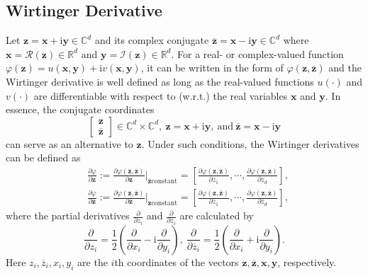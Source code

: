\documentclass{article}
\numberwithin{equation}{section}
\begin{document}
\subsection{Wirtinger Derivative}
Let $\mathbf{z}=\mathbf{x}+\mathrm{i}\mathbf{y}\in\mathbb{C}^d$ and its complex conjugate $\overline{\mathbf{z}}=\mathbf{x}-\mathrm{i}\mathbf{y}\in\mathbb{C}^d$ where $\mathbf{x}=\mathcal{R}(\mathbf{z})\in\mathbb{R}^d$ and $\mathbf{y}=\mathcal{I}(\mathbf{z})\in\mathbb{R}^d$. For a real- or complex-valued function $\varphi(\mathbf{z})=u(\mathbf{x},\mathbf{y})+\mathrm{i}v(\mathbf{x},\mathbf{y})$, it can be written in the form of $\varphi(\mathbf{z},\overline{\mathbf{z}})$ and the Wirtinger derivative is well defined as long as the real-valued functions
$u(\cdot)$ and $v(\cdot)$ are differentiable with respect to (w.r.t.) the real variables $\mathbf{x}$ and $\mathbf{y}$. In essence, the conjugate coordinates
$$
\begin{bmatrix} \mathbf{z}\\
	\overline{\mathbf{z}} \end{bmatrix}\in\mathbb{C}^d\times\mathbb{C}^d,~\mathbf{z}=\mathbf{x}+\mathrm{i}\mathbf{y},~\mbox{and}
~\overline{\mathbf{z}}=\mathbf{x}-\mathrm{i}\mathbf{y}$$
can serve as an alternative to $\mathbf{z}$.
Under such conditions, the Wirtinger derivatives can be defined as
$$\begin{aligned}
	&\frac{\partial \varphi}{\partial\mathbf{z}}:=\frac{\partial \varphi(\mathbf{z},\overline{\mathbf{z}})}{\partial\mathbf{z}}|_{\overline{\mathbf{z}}\mathrm{constant}}
	=[\frac{\partial\varphi(\mathbf{z},\overline{\mathbf{z}})}{\partial z_1},\cdots,\frac{\partial \varphi(\mathbf{z},\overline{\mathbf{z}})}{\partial z_d}],\\
	&\frac{\partial \varphi}{\partial\overline{\mathbf{z}}}:=\frac{\partial \varphi(\mathbf{z},\overline{\mathbf{z}})}{\partial\overline{\mathbf{z}}}|_{\mathbf{z}\mathrm{constant}}
	=[\frac{\partial \varphi(\mathbf{z},\overline{\mathbf{z}})}{\partial \overline{z}_1},\cdots,\frac{\partial \varphi(\mathbf{z},\overline{\mathbf{z}})}{\partial \overline{z}_d}],
\end{aligned}$$
where the partial derivatives $\frac{\partial}{\partial z_i}$ and $\frac{\partial}{\partial \overline{z}_i}$ are calculated by
$$\frac{\partial}{\partial z_i}=\frac{1}{2}(\frac{\partial}{\partial x_i}-\mathrm{i}\frac{\partial}{\partial y_i}),~\frac{\partial}{\partial \overline{z}_i}=\frac{1}{2}(\frac{\partial}{\partial x_i}+\mathrm{i}\frac{\partial}{\partial y_i}).$$
Here $z_i,\overline{z}_i,x_i,y_i$ are the $i$th coordinates of the vectors $\mathbf{z},\overline{\mathbf{z}},\mathbf{x},\mathbf{y}$, respectively.
\end{document}
